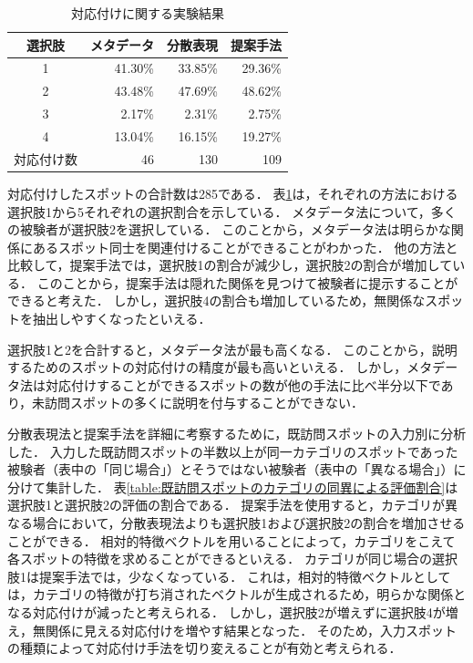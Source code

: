 \documentclass[submit]{ipsj}
\begin{document}
\begin{table}[t]
  \caption{対応付けに関する実験結果}
  \label{table:対応付けに関する実験結果}
  \centering
  \begin{tabular}{c|r|r|r}
  \hline \hline
  選択肢 & \multicolumn{1}{c|}{メタデータ} & \multicolumn{1}{c|}{分散表現} & \multicolumn{1}{c}{提案手法} \\ \hline
  1  & 41.30\%                    & 33.85\%                    & 29.36\% \\
  2  & 43.48\%                    & 47.69\%                    & 48.62\% \\
  3  & 2.17\%                     & 2.31\%                     & 2.75\% \\
  4  & 13.04\%                    & 16.15\%                    & 19.27\% \\
  \hline
  対応付け数  & 46                    & 130                    & 109 \\
   \hline
  \end{tabular}
\end{table}

対応付けしたスポットの合計数は285である．
表\ref{table:対応付けに関する実験結果}は，それぞれの方法における選択肢1から5それぞれの選択割合を示している．
メタデータ法について，多くの被験者が選択肢2を選択している．
このことから，メタデータ法は明らかな関係にあるスポット同士を関連付けることができることがわかった．
他の方法と比較して，提案手法では，選択肢1の割合が減少し，選択肢2の割合が増加している．
このことから，提案手法は隠れた関係を見つけて被験者に提示することができると考えた．
しかし，選択肢4の割合も増加しているため，無関係なスポットを抽出しやすくなったといえる．

選択肢1と2を合計すると，メタデータ法が最も高くなる．
このことから，説明するためのスポットの対応付けの精度が最も高いといえる．
しかし，メタデータ法は対応付けすることができるスポットの数が他の手法に比べ半分以下であり，未訪問スポットの多くに説明を付与することができない．

分散表現法と提案手法を詳細に考察するために，既訪問スポットの入力別に分析した．
入力した既訪問スポットの半数以上が同一カテゴリのスポットであった被験者（表中の「同じ場合」）とそうではない被験者（表中の「異なる場合」）に分けて集計した．
表\ref{table:既訪問スポットのカテゴリの同異による評価割合}は選択肢1と選択肢2の評価の割合である．
提案手法を使用すると，カテゴリが異なる場合において，分散表現法よりも選択肢1および選択肢2の割合を増加させることができる．
相対的特徴ベクトルを用いることによって，カテゴリをこえて各スポットの特徴を求めることができるといえる．
カテゴリが同じ場合の選択肢1は提案手法では，少なくなっている．
これは，相対的特徴ベクトルとしては，カテゴリの特徴が打ち消されたベクトルが生成されるため，明らかな関係となる対応付けが減ったと考えられる．
しかし，選択肢2が増えずに選択肢4が増え，無関係に見える対応付けを増やす結果となった．
そのため，入力スポットの種類によって対応付け手法を切り変えることが有効と考えられる．
\end{document}
